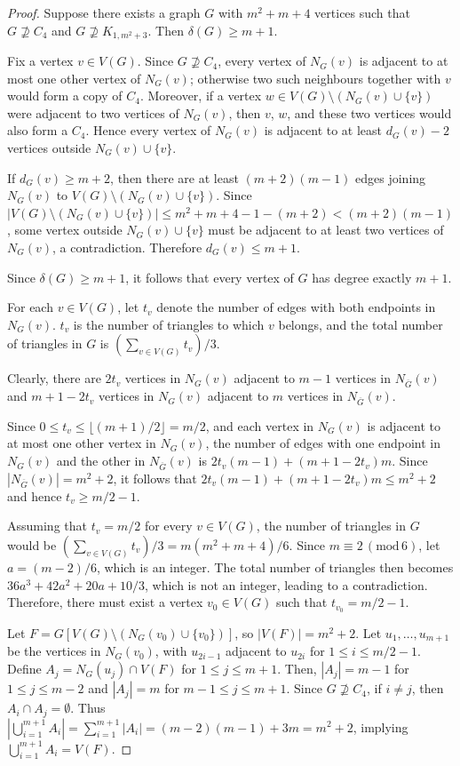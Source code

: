 \documentclass[10pt,a4paper]{amsart}
\begin{document}
\begin{proof}
Suppose there exists a graph $G$ with $m^2+m+4$ vertices such that
$G\nsupseteq C_4$ and $G\nsupseteq K_{1,m^2+3}$. Then $\delta(G)\ge m+1$.

Fix a vertex $v\in V(G)$. Since $G\nsupseteq C_4$, every vertex of $N_G(v)$ is adjacent
to at most one other vertex of $N_G(v)$; otherwise two such neighbours together with $v$
would form a copy of $C_4$. Moreover, if a vertex
$w\in V(G)\setminus (N_G(v)\cup\{v\})$ were adjacent to two vertices of $N_G(v)$, then
$v$, $w$, and these two vertices would also form a $C_4$. Hence every vertex of
$N_G(v)$ is adjacent to at least $d_G(v)-2$ vertices outside $N_G(v)\cup\{v\}$.

If $d_G(v)\ge m+2$, then there are at least
$(m+2)(m-1)$ edges joining $N_G(v)$ to
$V(G)\setminus (N_G(v)\cup\{v\})$. Since
$|V(G)\setminus (N_G(v)\cup\{v\})|
\le m^2+m+4-1-(m+2)<(m+2)(m-1)$,
some vertex outside $N_G(v)\cup\{v\}$ must be adjacent to at least two vertices of
$N_G(v)$, a contradiction. Therefore $d_G(v)\le m+1$.

Since $\delta(G)\ge m+1$, it follows that every vertex of $G$ has degree exactly $m+1$.

For each $v\in V(G)$, let $t_v$ denote the number of edges with both endpoints in $N_G(v)$. $t_v$ is the number of triangles to which $v$ belongs, and the total number of triangles in $G$ is $(\sum_{v\in V(G)}t_v)/3$.

Clearly, there are $2t_v$ vertices in $N_G(v)$ adjacent to $m-1$ vertices in $N_{\overline{G}}(v)$ and $m+1-2t_v$ vertices in $N_G(v)$ adjacent to $m$ vertices in $N_{\overline{G}}(v)$.

Since $0\le t_v\le\lfloor (m+1)/2\rfloor=m/2$, and each vertex in $N_G(v)$ is adjacent to at most one other vertex in $N_G(v)$,
the number of edges with one endpoint in $N_G(v)$ and the other in $N_{\overline{G}}(v)$ is $2t_v(m-1)+(m+1-2t_v)m$. Since $|N_{\overline{G}}(v)|=m^2+2$, it follows that $2t_v(m-1)+(m+1-2t_v)m\le m^2+2$ and hence $t_v\ge m/2-1$.

Assuming that $t_v=m/2$ for every $v\in V(G)$,  the number of triangles in $G$ would be $\left(\sum_{v\in V(G)}t_v\right)\!/3=m(m^2+m+4)/6.$ Since $m\equiv 2 \,(\text{mod}\, 6)$, let $a=(m-2)/6$, which is an integer. The total number of triangles then becomes $36a^3+42a^2+20a+10/3$, which is not an integer, leading to a contradiction. Therefore, there must exist a vertex $v_0\in V(G)$ such that $t_{v_0}=m/2-1$.

Let $F=G[V(G)\setminus(N_G(v_0)\cup\{v_0\})]$, so $|V(F)|=m^2+2$. Let $u_1,\ldots,u_{m+1}$ be the vertices in $N_G(v_0)$, with $u_{2i-1}$ adjacent to $u_{2i}$ for $1\le i\le m/2-1$. Define $A_j=N_G(u_j)\cap V(F)$ for $1\le j\le m+1$. Then, $|A_j|=m-1$ for $1\le j\le m-2$ and $|A_j|=m$ for $m-1\le j\le m+1$. Since $G\nsupseteq C_4$, if $i\ne j$, then $A_i\cap A_j=\emptyset$. Thus $|\bigcup_{i=1}^{m+1}A_i|=\sum_{i=1}^{m+1}|A_i|=(m-2)(m-1)+3m=m^2+2$, implying $\bigcup_{i=1}^{m+1}A_i=V(F)$.


\end{proof}
\end{document}
